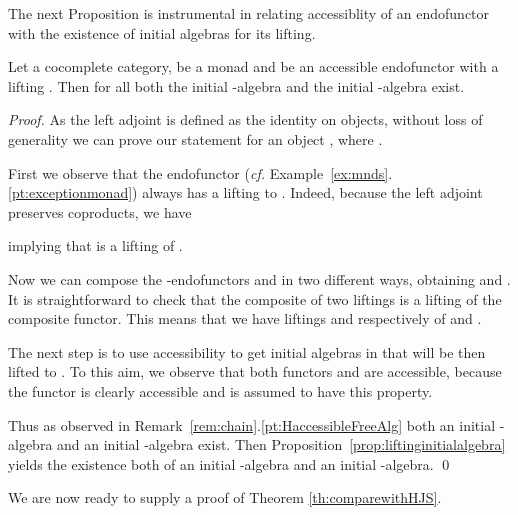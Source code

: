 \documentclass[oribibl,envcountsame,envcountsect,runningheads]{llncs}
\renewcommand{\>}{\rangle}
\begin{document}
The next Proposition is instrumental in relating accessiblity of an endofunctor with the existence of initial algebras for its lifting.

\newcommand{\propliftingCoproduct}{Let  a cocomplete category,  be a monad and  be an accessible endofunctor with a lifting . Then for all  both the initial -algebra and the initial -algebra exist.}
\begin{proposition} \label{prop:liftingCoproduct}
\propliftingCoproduct
\end{proposition}
\begin{proof} As the left adjoint  is defined as the identity on objects, without loss of generality we can prove our statement for an object , where .

First we observe that the endofunctor  (\emph{cf.} Example~\ref{ex:mnds}.\ref{pt:exceptionmonad}) always has a lifting to . Indeed, because the left adjoint  preserves coproducts, we have
 
 implying that  is a lifting of .

 Now we can compose the -endofunctors  and  in two different ways, obtaining  and . It is straightforward to check that the composite of two liftings is a lifting of the composite functor. This means that we have liftings  and  respectively of  and .

 The next step is to use accessibility to get initial algebras in  that will be then lifted to . To this aim, we observe that both functors  and  are accessible, because the functor  is clearly accessible and  is assumed to have this property.

Thus as observed in Remark~\ref{rem:chain}.\ref{pt:HaccessibleFreeAlg} both an initial -algebra and an initial -algebra exist. Then Proposition~\ref{prop:liftinginitialalgebra} yields the existence both of an initial -algebra and an initial -algebra. \qed
\end{proof}

We are now ready to supply a proof of Theorem \ref{th:comparewithHJS}.
\end{document}

